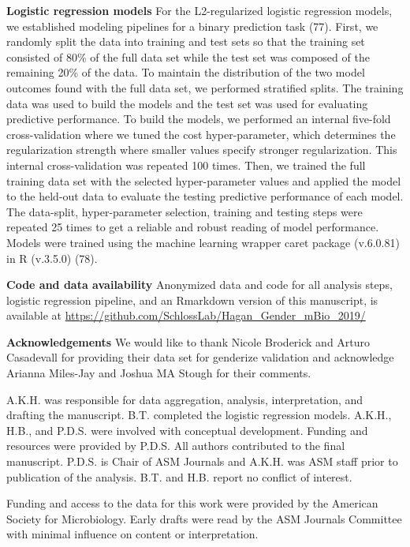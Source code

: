 \documentclass[11pt,]{article}
\begin{document}
\textbf{Logistic regression models} For the L2-regularized logistic
regression models, we established modeling pipelines for a binary
prediction task (77). First, we randomly split the data into training
and test sets so that the training set consisted of 80\% of the full
data set while the test set was composed of the remaining 20\% of the
data. To maintain the distribution of the two model outcomes found with
the full data set, we performed stratified splits. The training data was
used to build the models and the test set was used for evaluating
predictive performance. To build the models, we performed an internal
five-fold cross-validation where we tuned the cost hyper-parameter,
which determines the regularization strength where smaller values
specify stronger regularization. This internal cross-validation was
repeated 100 times. Then, we trained the full training data set with the
selected hyper-parameter values and applied the model to the held-out
data to evaluate the testing predictive performance of each model. The
data-split, hyper-parameter selection, training and testing steps were
repeated 25 times to get a reliable and robust reading of model
performance. Models were trained using the machine learning wrapper
caret package (v.6.0.81) in R (v.3.5.0) (78).

\textbf{Code and data availability} Anonymized data and code for all
analysis steps, logistic regression pipeline, and an Rmarkdown version
of this manuscript, is available at
\url{https://github.com/SchlossLab/Hagan_Gender_mBio_2019/}

\textbf{Acknowledgements} We would like to thank Nicole Broderick and
Arturo Casadevall for providing their data set for genderize validation
and acknowledge Arianna Miles-Jay and Joshua MA Stough for their
comments.

A.K.H. was responsible for data aggregation, analysis, interpretation,
and drafting the manuscript. B.T. completed the logistic regression
models. A.K.H., H.B., and P.D.S. were involved with conceptual
development. Funding and resources were provided by P.D.S. All authors
contributed to the final manuscript. P.D.S. is Chair of ASM Journals and
A.K.H. was ASM staff prior to publication of the analysis. B.T. and H.B.
report no conflict of interest.

Funding and access to the data for this work were provided by the
American Society for Microbiology. Early drafts were read by the ASM
Journals Committee with minimal influence on content or interpretation.
\end{document}
